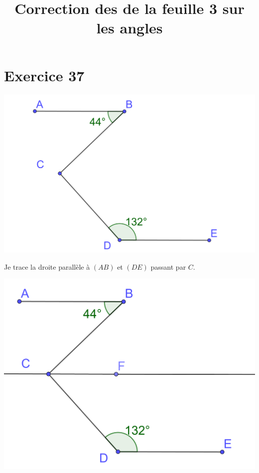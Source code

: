 \documentclass[12pt,a4paper]{article}
\title{Correction des de la feuille 3 sur les angles}
\date{}
\begin{document}
	
\maketitle

\vspace*{-1cm}

\section*{Exercice 37}

\begin{center}
	\includegraphics[scale=0.1]{ex37_1}
\end{center}

Je trace la droite parallèle à $(AB)$ et $(DE)$ passant par $C$.

\begin{center}
	\includegraphics[scale=0.1]{ex37_2}
\end{center}
\end{document}
